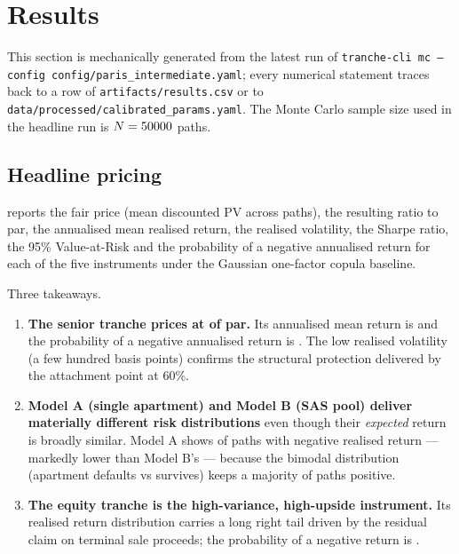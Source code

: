 \section{Results}\label{sec:results}

This section is mechanically generated from the latest run of
\texttt{tranche-cli mc --config config/paris\_intermediate.yaml}; every
numerical statement traces back to a row of
\texttt{artifacts/results.csv} or to
\texttt{data/processed/calibrated\_params.yaml}. The Monte Carlo sample
size used in the headline run is $N = 50000{}$ paths.

\subsection{Headline pricing}

 reports the fair price (mean discounted PV across
paths), the resulting ratio to par, the annualised mean realised return,
the realised volatility, the Sharpe ratio, the 95\% Value-at-Risk and the
probability of a negative annualised return for each of the five
instruments under the Gaussian one-factor copula baseline.



Three takeaways.
\begin{enumerate}
  \item \textbf{The senior tranche prices at \fairToParSenior{} of par.}
        Its annualised mean return is \meanReturnSenior{} and the
        probability of a negative annualised return is
        \probNegSenior{}. The low realised volatility (a few hundred basis
        points) confirms the structural protection delivered by the
        attachment point at 60\%.
  \item \textbf{Model A (single apartment) and Model B (SAS pool) deliver
        materially different risk distributions} even though their
        \emph{expected} return is broadly similar. Model A shows
        \probNegModela{} of paths with negative realised return ---
        markedly lower than Model B's \probNegModelb{} --- because the
        bimodal distribution (apartment defaults vs survives) keeps a
        majority of paths positive.
  \item \textbf{The equity tranche is the high-variance, high-upside
        instrument.} Its realised return distribution carries a long
        right tail driven by the residual claim on terminal sale
        proceeds; the probability of a negative return is
        \probNegEquity{}.
\end{enumerate}

